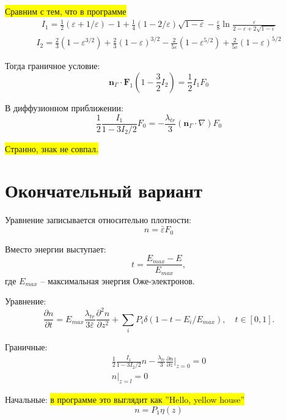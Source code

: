 \documentclass[a4paper,12pt]{article} %
\newcommand{\dff}[2]{\frac{\partial #1}{\partial #2}}
\newcommand{\dfn}[3]{\frac{\partial^#1 #2}{\partial #3^#1}}
\renewcommand{\vec}[1]{\bm{#1}}
\newcommand{\eps}{\varepsilon}
\begin{document}
\colorbox{yellow}{Сравним с тем, что в программе}
\begin{gather*}
I_1 =
\frac{1}{2} (\eps + 1/\eps) - 1 +
\frac{1}{4} (1 - 2/\eps)\sqrt{1 - \eps} -
\frac{\eps}{8} \ln \frac{\eps}{2 - \eps + 2 \sqrt{1 - \eps}}
\end{gather*}
\begin{gather*}
I_2 =
\frac{2}{3} (1 -\eps^{3/2})
+ \frac{2}{3} (1 -\eps)^{3/2}
- \frac{2}{5 \eps} (1 -\eps^{5/2})
+ \frac{2}{5 \eps} (1 -\eps)^{5/2}
\end{gather*}

Тогда граничное условие:
\begin{equation}
    \vec{n}_\Gamma \cdot \vec{F}_1 \left(1 - \frac{3}{2} I_2 \right) = \frac{1}{2} I_1 F_0
\end{equation}

В диффузионном приближении:
\begin{equation}
    \frac{1}{2} \frac{I_1}{1 - 3 I_2/2} F_0 = -\frac{\lambda_{tr}}{3}
    (\vec{n}_\Gamma \cdot \nabla) F_0
\end{equation}

\colorbox{yellow}{Странно, знак не совпал.}

\clearpage
\section{Окончательный вариант}

Уравнение записывается относительно плотности:
\begin{equation}
    n = \bar{\eps} F_0
\end{equation}

Вместо энергии выступает:
\begin{equation}
    t = \frac{E_{max} - E}{E_{max}},
\end{equation}
где $E_{max}$ -- максимальная энергия Оже-электронов.

Уравнение:
\begin{equation}
    \dff{n}{t} = E_{max}\frac{\lambda_{tr}}{3\bar{\eps}}\dfn{2}{n}{z} + \sum_{i} P_i\delta(1 - t - E_i/E_{max}), \quad t\in[0, 1].
\end{equation}

Граничные:
\begin{gather}
    \frac{1}{2} \frac{I_1}{1 - 3 I_2/2} n - \frac{\lambda_{tr}}{3} \dff{n}{z} \Bigg|_{z = 0} = 0 \\
    n\Bigg|_{z = l} = 0
\end{gather}

Начальные: \colorbox{yellow}{в программе это выглядит как ''Hello, yellow house''}
\begin{equation}
    n = P_1 \eta (z)
\end{equation}
\end{document}
